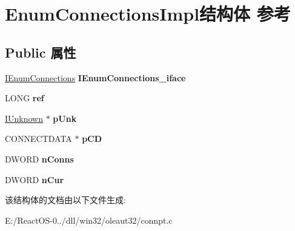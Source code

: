\hypertarget{struct_enum_connections_impl}{}\section{Enum\+Connections\+Impl结构体 参考}
\label{struct_enum_connections_impl}
\subsection*{Public 属性}
\begin{DoxyCompactItemize}
\item 
\mbox{\label{struct_enum_connections_impl_a69cef16b5f66ef900f7f535694140e66}} 
\hyperlink{interface_i_enum_connections}{I\+Enum\+Connections} {\bfseries I\+Enum\+Connections\+\_\+iface}
\item 
\mbox{\label{struct_enum_connections_impl_a7bbb2235739f4bdea9bf5a59d8903d33}} 
L\+O\+NG {\bfseries ref}
\item 
\mbox{\label{struct_enum_connections_impl_aecee547adfc8670f4d1582aa806e26af}} 
\hyperlink{interface_i_unknown}{I\+Unknown} $\ast$ {\bfseries p\+Unk}
\item 
\mbox{\label{struct_enum_connections_impl_ae656762352882da6a80d07c714bd0f06}} 
C\+O\+N\+N\+E\+C\+T\+D\+A\+TA $\ast$ {\bfseries p\+CD}
\item 
\mbox{\label{struct_enum_connections_impl_a85b49524be87d8b86732b01f84fe2d63}} 
D\+W\+O\+RD {\bfseries n\+Conns}
\item 
\mbox{\label{struct_enum_connections_impl_a790987c42e2caad3229288339fa1068a}} 
D\+W\+O\+RD {\bfseries n\+Cur}
\end{DoxyCompactItemize}


该结构体的文档由以下文件生成\+:\begin{DoxyCompactItemize}
\item 
E\+:/\+React\+O\+S-\/0../dll/win32/oleaut32/connpt.\+c\end{DoxyCompactItemize}

